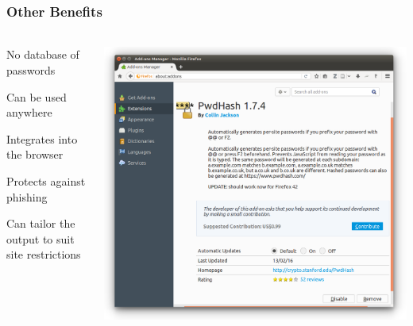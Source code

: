 \documentclass[handout, notes=hide]{beamer}
\begin{document}

\begin{frame}
\frametitle{Other Benefits}
\framesubtitle{}
\setlength{\parskip}{0.5em}

\begin{columns}[T]
\begin{column}[T]{0.5\textwidth}
\setlength{\parskip}{0.5em}

No database of passwords

Can be used anywhere

Integrates into the browser

Protects against phishing

Can tailor the output to suit site restrictions

\end{column}
\begin{column}[T]{0.5\textwidth}
\includegraphics[width=1.0\textwidth]{plugin}
\end{column}
\end{columns}

\end{frame}

\end{document}
